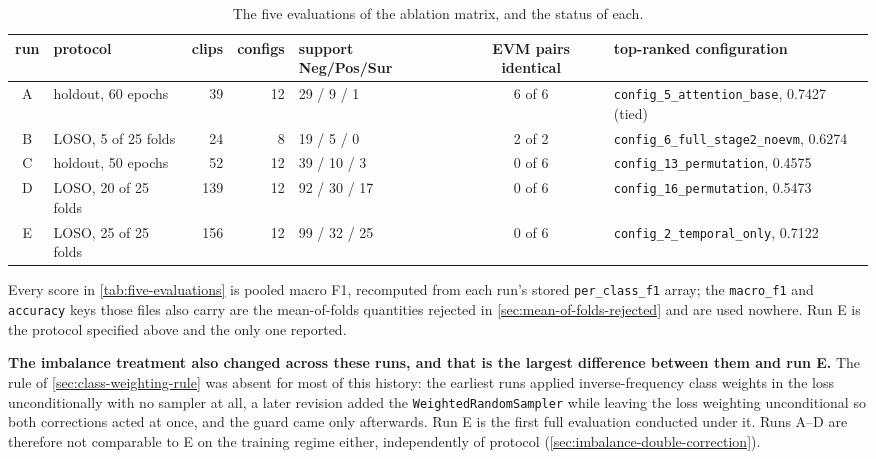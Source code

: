 \begin{table}[htbp]
	\centering
	\footnotesize
	\begin{tabular}{c l r r l c p{3.6cm}}
		\hline
		\textbf{run} & \textbf{protocol} & \textbf{clips} & \textbf{configs} & \textbf{support Neg/Pos/Sur} & \textbf{EVM pairs identical} & \textbf{top-ranked configuration} \\
		\hline
		A & holdout, 60 epochs      & 39  & 12 & 29 / 9 / 1    & 6 of 6 & \texttt{config\_5\_attention\_base}, 0.7427 (tied) \\
		B & LOSO, 5 of 25 folds     & 24  & 8  & 19 / 5 / 0    & 2 of 2 & \texttt{config\_6\_full\_stage2\_noevm}, 0.6274 \\
		C & holdout, 50 epochs      & 52  & 12 & 39 / 10 / 3   & 0 of 6 & \texttt{config\_13\_permutation}, 0.4575 \\
		D & LOSO, 20 of 25 folds    & 139 & 12 & 92 / 30 / 17  & 0 of 6 & \texttt{config\_16\_permutation}, 0.5473 \\
		E & LOSO, 25 of 25 folds    & 156 & 12 & 99 / 32 / 25  & 0 of 6 & \texttt{config\_2\_temporal\_only}, 0.7122 \\
		\hline
	\end{tabular}
	\caption[The five evaluations of the ablation matrix]{The five evaluations of the ablation matrix, and the status of each.}
	\label{tab:five-evaluations}
\end{table}

Every score in \autoref{tab:five-evaluations} is pooled macro F1, recomputed from each run's stored \texttt{per\_class\_f1} array; the \texttt{macro\_f1} and \texttt{accuracy} keys those files also carry are the mean-of-folds quantities rejected in \autoref{sec:mean-of-folds-rejected} and are used nowhere. Run E is the protocol specified above and the only one reported.

\textbf{The imbalance treatment also changed across these runs, and that is the largest difference between them and run E.} The rule of \autoref{sec:class-weighting-rule} was absent for most of this history: the earliest runs applied inverse-frequency class weights in the loss unconditionally with no sampler at all, a later revision added the \texttt{WeightedRandomSampler} while leaving the loss weighting unconditional so both corrections acted at once, and the guard came only afterwards. Run E is the first full evaluation conducted under it. Runs A--D are therefore not comparable to E on the training regime either, independently of protocol (\autoref{sec:imbalance-double-correction}).

